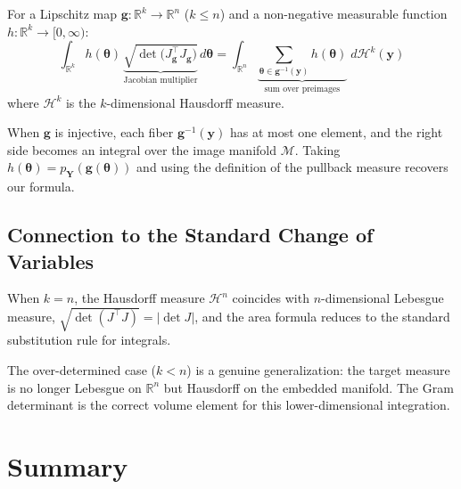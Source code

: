 \documentclass[11pt,a4paper]{article}
\theoremstyle{definition}
\newcommand{\btheta}{\boldsymbol{\theta}}
\begin{document}
For a Lipschitz map $\mathbf{g}: \mathbb{R}^k \to \mathbb{R}^n$ ($k \leq n$)
and a non-negative measurable function $h: \mathbb{R}^k \to [0, \infty)$:
\begin{equation}
    \int_{\mathbb{R}^k} h(\btheta) \,
    \underbrace{\sqrt{\det\!\big(J_{\mathbf{g}}^\top J_{\mathbf{g}}\big)}}_{
    \text{Jacobian multiplier}} \, d\btheta
    = \int_{\mathbb{R}^n}
    \underbrace{\sum_{\btheta \in \mathbf{g}^{-1}(\mathbf{y})}
    h(\btheta)}_{\text{sum over preimages}} \;
    d\mathcal{H}^k(\mathbf{y})
\end{equation}
where $\mathcal{H}^k$ is the $k$-dimensional Hausdorff measure.

When $\mathbf{g}$ is injective, each fiber $\mathbf{g}^{-1}(\mathbf{y})$
has at most one element, and the right side becomes an integral over the
image manifold $\mathcal{M}$. Taking
$h(\btheta) = p_{\mathbf{Y}}(\mathbf{g}(\btheta))$ and using the
definition of the pullback measure recovers our formula.

\subsection{Connection to the Standard Change of Variables}

When $k = n$, the Hausdorff measure $\mathcal{H}^n$ coincides with
$n$-dimensional Lebesgue measure, $\sqrt{\det(J^\top J)} = |\!\det J|$, and
the area formula reduces to the standard substitution rule for integrals.

The over-determined case ($k < n$) is a genuine generalization: the target
measure is no longer Lebesgue on $\mathbb{R}^n$ but Hausdorff on the
embedded manifold. The Gram determinant is the correct volume element for
this lower-dimensional integration.


\section{Summary}
\label{sec:summary}
\end{document}
